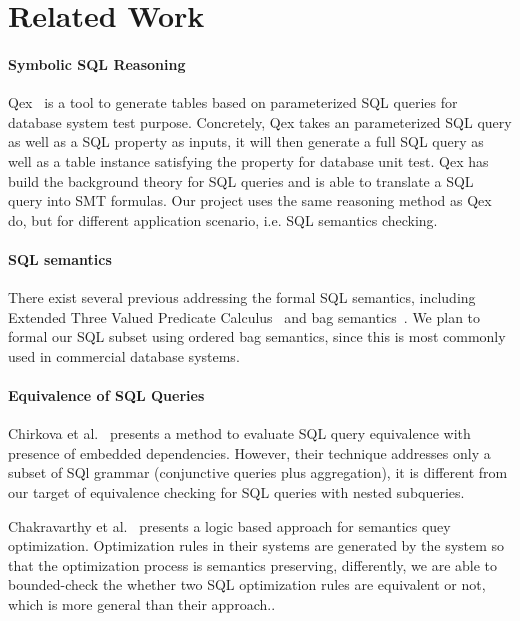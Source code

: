 \documentclass{article}
\begin{document}
\section{Related Work}

\paragraph{Symbolic SQL Reasoning} Qex~\cite{veanes2010qex,veanes2009symbolic} is a tool to generate tables based on parameterized SQL queries for database system test purpose. Concretely, Qex takes an parameterized SQL query as well as a SQL property as inputs, it will then generate a full SQL query as well as a table instance satisfying the property for database unit test. Qex has build the background theory for SQL queries and is able to translate a SQL query into SMT formulas. Our project uses the same reasoning method as Qex do, but for different application scenario, i.e. SQL semantics checking.

\paragraph{SQL semantics} There exist several previous addressing the formal SQL semantics, including Extended Three Valued Predicate Calculus~\cite{Negri:1991:FSS:111197.111212} and bag semantics~\cite{chinaei2007ordered}. We plan to formal our SQL subset using ordered bag semantics, since this is most commonly used in commercial database systems.

\paragraph{Equivalence of SQL Queries} Chirkova et al.~\cite{chirkova2009equivalence} presents a method to evaluate SQL query equivalence with presence of embedded dependencies. However, their technique addresses only a subset of SQl grammar (conjunctive queries plus aggregation), it is different from our target of equivalence checking for SQL queries with nested subqueries. 

Chakravarthy et al.~\cite{Chakravarthy:1990:LAS:78922.78924} presents a logic based approach for semantics quey optimization. Optimization rules in their systems are generated by the system so that the optimization process is semantics preserving, differently, we are able to bounded-check the whether two SQL optimization rules are equivalent or not, which is more general than their approach..

{}

\end{document}
